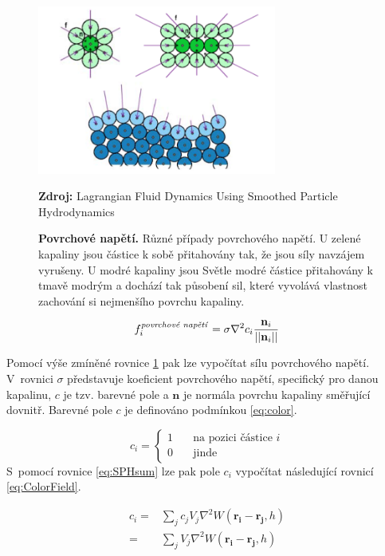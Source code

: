 \begin{figure}[hbt]
	\centering
	\captionsetup{justification=centering}
	\includegraphics[width=0.7\textwidth]{obrazky-figures/SurfTens.png}
	\caption{\textbf{Povrchové napětí.} Různé případy povrchového napětí. U zelené kapaliny jsou částice k sobě přitahovány tak, že jsou síly navzájem vyrušeny. U modré kapaliny jsou Světle modré částice přitahovány k tmavě modrým a dochází tak působení sil, které vyvolává vlastnost zachování si nejmenšího povrchu kapaliny.}
	\textbf{Zdroj: } Lagrangian Fluid Dynamics Using Smoothed Particle Hydrodynamics \cite{KelagerSPH}
	\label{fig:SurTen}
\end{figure}

\begin{equation}
	f_i^{\text{\textit{povrchové napětí}}} = \sigma \nabla^2 c_i \frac{\mathbf{n}_i}{||\mathbf{n}_i||}
	\label{eq:SurfTen}
\end{equation}

Pomocí výše zmíněné rovnice \ref{fig:SurTen} pak lze vypočítat sílu povrchového napětí. V~rovnici $\sigma$ představuje koeficient povrchového napětí, specifický pro danou kapalinu, $c$ je tzv. barevné pole a $\mathbf{n}$ je normála povrchu kapaliny směřující dovnitř. Barevné pole $c$ je definováno podmínkou \ref{eq:color}.

\begin{equation}
	c_i =
	\begin{cases}
		1 & \quad  \text{na pozici částice } i \\
		0 & \quad  \text{jinde}
	\end{cases}
	\label{eq:color}
\end{equation}
S~pomocí rovnice \ref{eq:SPHsum} lze pak pole $c_i$ vypočítat následující rovnicí \ref{eq:ColorField}.

\begin{equation}
	\begin{split}
		c_i =   & \sum_j c_j V_j \nabla^2 W(\mathbf{r_i} - \mathbf{r_j},h) \\
		=   & \sum_j V_j \nabla^2 W(\mathbf{r_i} - \mathbf{r_j},h)
	\end{split}
	\label{eq:ColorField}
\end{equation}

